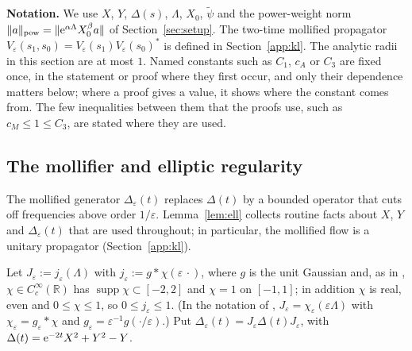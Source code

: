 \medskip\noindent\textbf{Notation.}
We use $X$, $Y$, $\Delta(s)$, $\Lambda$, $X_0$, $\tilde\psi$ and the power-weight norm $\lVert a\rVert_{\mathrm{pow}}=\lVert \mathrm{e}^{\alpha\Lambda}X_0^\beta a\rVert$
of Section~\ref{sec:setup}.
The two-time mollified propagator $V_\varepsilon(s_1,s_0)=V_\varepsilon(s_1)V_\varepsilon(s_0)^*$ is defined in
Section~\ref{app:kl}. The analytic radii in this section are at most $1$. Named constants such as $C_1$, $c_A$ or $C_3$ are fixed
once, in the statement or proof where they first occur, and only their dependence matters below; where a proof gives a value, it
shows where the constant comes from. The few inequalities between them that the proofs use, such as $c_M\le1\le C_3$, are stated
where they are used.



\subsection{The mollifier and elliptic regularity}
The mollified generator $\Delta_\varepsilon(t)$ replaces $\Delta(t)$ by a bounded operator that cuts off frequencies above order
$1/\varepsilon$. Lemma~\ref{lem:ell} collects routine facts about $X$, $Y$ and $\Delta_\varepsilon(t)$ that are used throughout; in
particular, the mollified flow is a unitary propagator (Section~\ref{app:kl}).

Let $J_\varepsilon:=j_\varepsilon(\Lambda)$ with $j_\varepsilon:=g*\chi(\varepsilon\,\cdot)$, where $g$ is the unit Gaussian and, as in
\cite[(4.20)--(4.21)]{S}, $\chi\in C_c^\infty(\mathbb R)$ has $\operatorname{supp}\chi\subset[-2,2]$ and $\chi=1$ on $[-1,1]$; in
addition $\chi$ is real, even and $0\le\chi\le1$, so $0\le j_\varepsilon\le1$. (In the notation of \cite{S},
$J_\varepsilon=\chi_\varepsilon(\varepsilon\Lambda)$ with $\chi_\varepsilon=g_\varepsilon*\chi$ and $g_\varepsilon=\varepsilon^{-1}g(\cdot/\varepsilon)$.) Put $\Delta_\varepsilon(t)=J_\varepsilon\Delta(t)J_\varepsilon$, with $\Delta(t)=\mathrm{e}^{-2t}X^2+Y^2-Y$.

